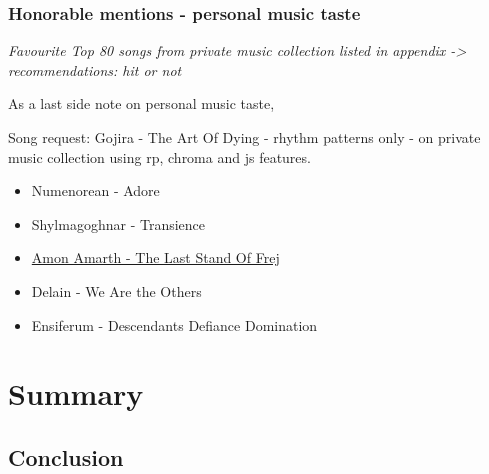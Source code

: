 \subsection{Honorable mentions - personal music taste}

\textit{Favourite Top 80 songs from private music collection listed in appendix -> recommendations: hit or not}

As a last side note on personal music taste, 

\noindent Song request: Gojira - The Art Of Dying - rhythm patterns only - on private music collection using rp, chroma and js features. \\

\begin{itemize}
	\setlength\itemsep{-0.5em}
	\item Numenorean - Adore
	\item Shylmagoghnar - Transience
	\item \underline{Amon Amarth - The Last Stand Of Frej}
	\item Delain - We Are the Others
	\item Ensiferum - Descendants Defiance Domination
\end{itemize}

\chapter{Summary}

\section{Conclusion}

